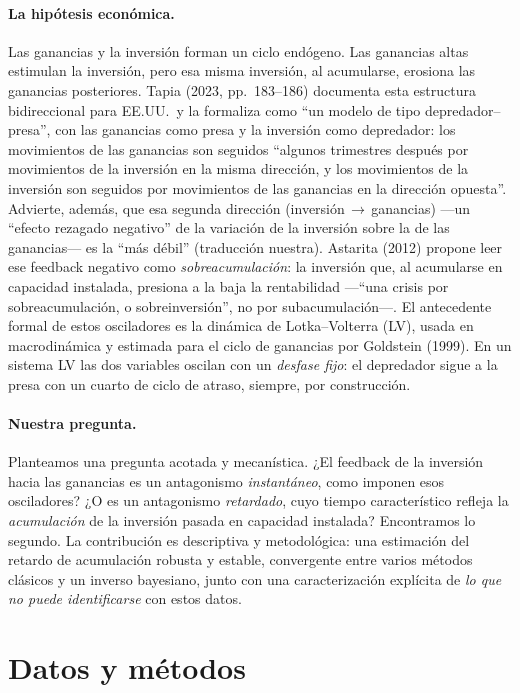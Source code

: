 \documentclass[11pt]{article}
\begin{document}
\paragraph{La hipótesis económica.} Las ganancias y la inversión forman un ciclo endógeno. Las
ganancias altas estimulan la inversión, pero esa misma inversión, al acumularse, erosiona las
ganancias posteriores. Tapia (2023, pp.~183--186) documenta esta estructura bidireccional para
EE.UU.\ y la formaliza como ``un modelo de tipo depredador--presa'', con las ganancias como presa y
la inversión como depredador: los movimientos de las ganancias son seguidos ``algunos trimestres
después por movimientos de la inversión en la misma dirección, y los movimientos de la inversión son
seguidos por movimientos de las ganancias en la dirección opuesta''. Advierte, además, que esa
segunda dirección (inversión\,$\to$\,ganancias) ---un ``efecto rezagado negativo'' de la variación de
la inversión sobre la de las ganancias--- es la ``más débil'' (traducción nuestra). Astarita (2012) propone leer ese
feedback negativo como \emph{sobreacumulación}: la inversión que, al acumularse en capacidad
instalada, presiona a la baja la rentabilidad ---``una crisis por sobreacumulación, o
sobreinversión'', no por subacumulación---. El antecedente formal de estos osciladores es la
dinámica de Lotka--Volterra (LV), usada en macrodinámica y estimada para el ciclo de ganancias por
Goldstein (1999). En un sistema LV las dos variables oscilan con un \emph{desfase fijo}: el depredador
sigue a la presa con un cuarto de ciclo de atraso, siempre, por construcción.

\paragraph{Nuestra pregunta.} Planteamos una pregunta acotada y mecanística. ¿El feedback de la
inversión hacia las ganancias es un antagonismo \emph{instantáneo}, como imponen esos osciladores?
¿O es un antagonismo \emph{retardado}, cuyo tiempo característico refleja la \emph{acumulación} de la
inversión pasada en capacidad instalada? Encontramos lo segundo. La contribución es descriptiva y
metodológica: una estimación del retardo de acumulación robusta y estable, convergente entre varios
métodos clásicos y un inverso bayesiano, junto con una caracterización explícita de \emph{lo que no
puede identificarse} con estos datos.

\section{Datos y métodos}
\end{document}
